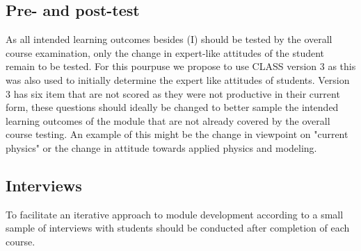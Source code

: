 \documentclass[11pt, twocolumn]{article}
\begin{document}
\subsection{Pre- and post-test}

As all intended learning outcomes besides (I) should be tested by the overall course examination, only the change in expert-like attitudes of the student remain to be tested. For this pourpuse we propose to use CLASS version 3 \citep{adams2006new} as this was also used to initially determine the expert like attitudes of students. Version 3 has six item that are not scored as they were not productive in their current form, these questions should ideally be changed to better sample the intended learning outcomes of the module that are not already covered by the overall course testing. An example of this might be the change in viewpoint on "current physics" or the change in attitude towards applied physics and modeling.

\subsection{Interviews}

To facilitate an iterative approach to module development according to \citet[Ch.6][]{redish2004teaching} a small sample of interviews with students should be conducted after completion of each course.


\newpage


\end{document}
